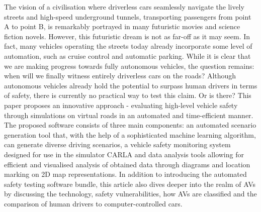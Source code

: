 The vision of a civilisation where driverless cars seamlessly navigate the lively streets and high-speed underground tunnels, transporting passengers from point A to point B, is remarkably portrayed in many futuristic movies and science fiction novels. However, this futuristic dream is not as far-off as it may seem. In fact, many vehicles operating the streets today already incorporate some level of automation, such as cruise control and automatic parking. While it is clear that we are making progress towards fully autonomous vehicles, the question remains: when will we finally witness entirely driverless cars on the roads? Although autonomous vehicles already hold the potential to surpass human drivers in terms of safety, there is currently no practical way to test this claim. Or is there?
This paper proposes an innovative approach - evaluating high-level vehicle safety through simulations on virtual roads in an automated and time-efficient manner. The proposed software consists of three main components: an automated scenario generation tool that, with the help of a sophisticated machine learning algorithm, can generate diverse driving scenarios, a vehicle safety monitoring system designed for use in the simulator CARLA and data analysis tools allowing for efficient and visualised analysis of obtained data through diagrams and location marking on 2D map representations. In addition to introducing the automated safety testing software bundle, this article also dives deeper into the realm of AVs by discussing the technology, safety vulnerabilities, how AVs are classified and the comparison of human drivers to computer-controlled cars.